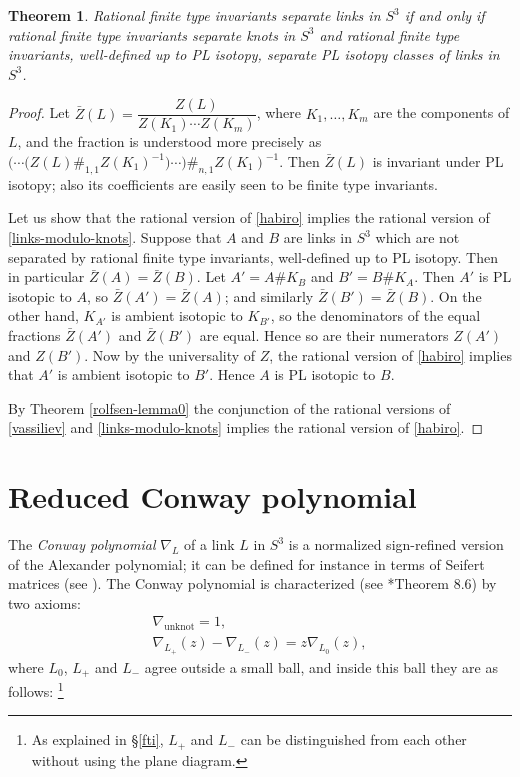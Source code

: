 \documentclass[a4paper,12pt,reqno,oneside]{amsart} %
\theoremstyle{plain}
\newtheorem{theorem}{Theorem}[section]
\theoremstyle{definition}
\theoremstyle{named}
\renewcommand{\:}{\colon}
\begin{document}
\begin{theorem}\label{rational}
Rational finite type invariants separate links in $S^3$ if and only if rational finite type invariants separate knots in $S^3$ and 
rational finite type invariants, well-defined up to PL isotopy, separate PL isotopy classes of links in $S^3$.
\end{theorem}

\begin{proof}
Let $\bar Z(L)=\dfrac{Z(L)}{Z(K_1)\cdots Z(K_m)}$, where $K_1,\dots,K_m$ are the components of $L$,
and the fraction is understood more precisely as $\big(\cdots\big(Z(L)\#_{1,1}Z(K_1)^{-1}\big)\cdots\big)\#_{n,1}Z(K_1)^{-1}$.
Then $\bar Z(L)$ is invariant under PL isotopy; also its coefficients are easily seen to be finite type invariants.

Let us show that the rational version of \ref{habiro} implies the rational version of \ref{links-modulo-knots}.
Suppose that $A$ and $B$ are links in $S^3$ which are not separated by rational finite type invariants,
well-defined up to PL isotopy.
Then in particular $\bar Z(A)=\bar Z(B)$.
Let $A'=A\#K_B$ and $B'=B\#K_A$.
Then $A'$ is PL isotopic to $A$, so $\bar Z(A')=\bar Z(A)$; and similarly $\bar Z(B')=\bar Z(B)$.
On the other hand, $K_{A'}$ is ambient isotopic to $K_{B'}$, so the denominators of the equal fractions 
$\bar Z(A')$ and $\bar Z(B')$ are equal.
Hence so are their numerators $Z(A')$ and $Z(B')$.
Now by the universality of $Z$, the rational version of \ref{habiro} implies that $A'$ is ambient isotopic to $B'$.
Hence $A$ is PL isotopic to $B$.

By Theorem \ref{rolfsen-lemma0} the conjunction of the rational versions of \ref{vassiliev} and \ref{links-modulo-knots} implies 
the rational version of \ref{habiro}.
\end{proof}


\section{Reduced Conway polynomial} \label{conway}

The {\it Conway polynomial} $\nabla_L$ of a link $L$ in $S^3$ is a normalized sign-refined version of the Alexander polynomial;
it can be defined for instance in terms of Seifert matrices (see \cite{Lic}).
The Conway polynomial is characterized (see \cite{Lic}*{Theorem 8.6}) by two axioms:
\begin{gather*}\nabla_{\text{unknot}}=1,\\
\nabla_{L_+}(z)-\nabla_{L_-}(z)=z\nabla_{L_0}(z),\tag{C}\label{conway-skein}
\end{gather*}
where $L_0$, $L_+$ and $L_-$ agree outside a small ball, and inside this ball they are as follows:%
\footnote{As explained in \S\ref{fti}, $L_+$ and $L_-$ can be distinguished from each other without using the plane diagram.}
\smallskip
\end{document}
